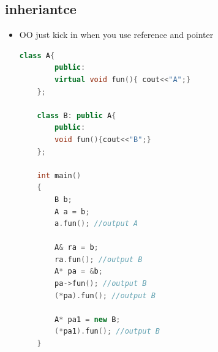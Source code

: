 \documentclass[a4paper,12pt,twoside]{book}
\begin{document}
\subsection{inheriantce}
\begin{itemize}
	\item OO just kick in when you use reference and pointer
\begin{lstlisting}[frame=single, language=c++]
	class A{
		public:
		virtual void fun(){ cout<<"A";}
	};
	
	class B: public A{
		public:
		void fun(){cout<<"B";}
	};
	
	int main()
	{
		B b;
		A a = b;
		a.fun(); //output A
		
		A& ra = b;
		ra.fun(); //output B
		A* pa = &b;
		pa->fun(); //output B
		(*pa).fun(); //output B
		
		A* pa1 = new B;
		(*pa1).fun(); //output B
	}
\end{lstlisting}
\end{itemize}
\end{document}
